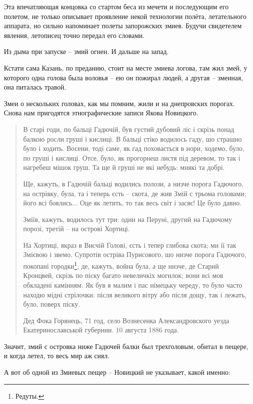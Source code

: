 Эта впечатляющая концовка со стартом беса из мечети и последующим его полетом, не только описывает проявление некой технологии полёта, летательного аппарата, но сильно напоминает полеты запорожских змиев. Будучи свидетелем явления, летописец точно передал его словами. 

Из дыма при запуске – змий огнен. И дальше на запад.

Кстати сама Казань, по преданию, стоит на месте змиева логова, там жил змей, у которого одна голова была воловья – ею он пожирал людей, а другая – змеиная, она питалась травой.
   
Змеи о нескольких головах, как мы помним, жили и на днепровских порогах. Снова нам пригодятся этнографические записи Якова Новицкого.

\begin{quotation}
В старі годи, по бальці Гадючій, був густий дубовий ліс і скрізь понад балкою росли груші і кислиці. В бальці стіко водилось гаду, шо страшно було і ходить. Восени, тоді саме, як гад поховається в нори, ходемо, було, по груші і кислиці. Отсе, було, як прогорнеш листя під деревом, то так і нагребеш мішок груш. Та ще й груші не які небудь: мнякі та добрі.

Ще, кажуть, в Гадючій бальці водились полози, а низче порога Гадючого, на острівку, була, та і теперь єсть – скота, де жив Змій с трьома головами; його всі боялись... Оце як летить, то так весь світ і засяє! Це було давно.

Зміїв, кажуть, водилось тут три: один на Перуні, другий на Гадючому порозі, третій – на острові Хортиці. 

На Хортиці, якраз в Висчій Голові, єсть і тепер глибока скота; ми її так Змієвою і звемо. Супротів остріва Пурисового, шо низче порога Гадючого, покопані городки\footnote{Редуты.}, де, кажуть, война була, а ще низче, де Старий Кронцвей, скрізь по піску багато невеличкіх могилок; вони всі мов обкладені камінням. Як був я малим і пас німецьку череду, то було часто находю мідні стрілочки: після великого вітру або після дощу, так і лежать, було, поверх піску.

Дед Фока Горянець, 71 год, село Вознесенка Александровского уезда Екатеринославськой губернии. 10 августа 1886 года.
\end{quotation}

Значит, змий с островка ниже Гадючей балки был трехголовым, обитал в пещере, и когда летел, то весь мир аж сиял.

А вот об одной из Змиевых пещер – Новицкий не указывает, какой именно:

